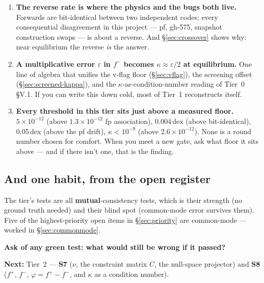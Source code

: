 \begin{enumerate}
\item \textbf{The reverse rate is where the physics and the bugs both live.}
      Forwards are bit-identical between two independent codes; every
      consequential disagreement in this project --- pf, gh-575, snapshot
      construction swaps --- is about a reverse. And \S\ref{sec:crossover} shows
      why: near equilibrium the reverse \emph{is} the answer.
\item \textbf{A multiplicative error $\varepsilon$ in $f^-$ becomes
      $\kappa \approx \varepsilon/2$ at equilibrium.} One line of algebra that
      unifies the v-flag floor (\S\ref{sec:vflag}), the screening offset
      (\S\ref{sec:screened-kappa}), and the $\kappa$-as-condition-number reading
      of Tier~0 \S V.1. If you can write this down cold, most of Tier~1
      reconstructs itself.
\item \textbf{Every threshold in this tier sits just above a measured floor.}
      $5\times10^{-12}$ (above $1.3\times10^{-12}$ fp association), 0.004\,dex
      (above bit-identical), 0.05\,dex (above the pf drift),
      $\kappa < 10^{-9}$ (above $2.6\times10^{-12}$). None is a round number
      chosen for comfort. When you meet a new gate, ask what floor it sits above
      --- and if there isn't one, that is the finding.
\end{enumerate}

\subsection*{And one habit, from the open register}

The tier's tests are all \textbf{mutual}-consistency tests, which is their
strength (no ground truth needed) and their blind spot (common-mode error
survives them). Five of the highest-priority open items in
\S\ref{sec:priority} are common-mode --- worked in \S\ref{sec:commonmode}.

\begin{invariant}
\textbf{Ask of any green test: what would still be wrong if it passed?}
\end{invariant}

\vspace{1em}
\noindent\textbf{Next:} Tier~2 --- \textbf{S7} ($\nu$, the constraint matrix
$C$, the null-space projector) and \textbf{S8} ($f^+$, $f^-$,
$\varphi = f^+ - f^-$, and $\kappa$ as a condition number).
